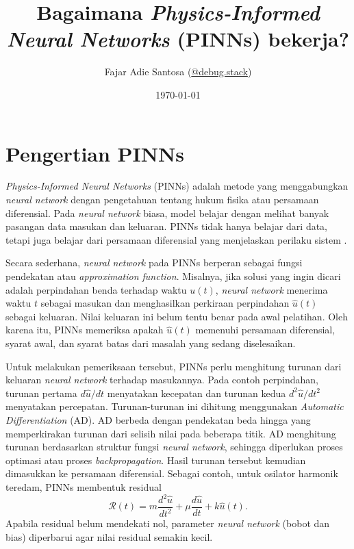 \documentclass[12pt, letterpaper]{article}
\title{Bagaimana \textit{Physics-Informed Neural Networks} (PINNs) bekerja?}
\author{Fajar Adie Santosa (\href{https://www.instagram.com/debug_stack/}{@debug.stack})}
\date{\today}
\begin{document}
\maketitle

\newpage
\tableofcontents
\newpage

\section{Pengertian PINNs}

\textit{Physics-Informed Neural Networks} (PINNs) adalah metode yang
menggabungkan \textit{neural network} dengan pengetahuan tentang hukum fisika atau persamaan diferensial. Pada
\textit{neural network} biasa, model belajar dengan melihat banyak pasangan data
masukan dan keluaran. PINNs tidak hanya belajar dari data, tetapi juga belajar
dari persamaan diferensial yang menjelaskan perilaku sistem \cite{matlab}.

Secara sederhana, \textit{neural network} pada PINNs berperan sebagai fungsi pendekatan atau \textit{approximation function}.
Misalnya, jika solusi yang ingin dicari adalah perpindahan benda terhadap waktu
$u(t)$, \textit{neural network} menerima waktu $t$ sebagai masukan dan menghasilkan perkiraan
perpindahan $\hat{u}(t)$ sebagai keluaran. Nilai keluaran ini belum tentu benar
pada awal pelatihan. Oleh karena itu, PINNs memeriksa apakah $\hat{u}(t)$
memenuhi persamaan diferensial, syarat awal, dan syarat batas dari masalah yang
sedang diselesaikan.

Untuk melakukan pemeriksaan tersebut, PINNs perlu menghitung turunan dari
keluaran \textit{neural network} terhadap masukannya. Pada contoh perpindahan, turunan pertama
$d\hat{u}/dt$ menyatakan kecepatan dan turunan kedua
$d^2\hat{u}/dt^2$ menyatakan percepatan. Turunan-turunan ini dihitung
menggunakan \textit{Automatic Differentiation} (AD).
AD berbeda dengan pendekatan beda hingga yang memperkirakan turunan dari
selisih nilai pada beberapa titik. AD menghitung turunan berdasarkan struktur
fungsi \textit{neural network}, sehingga diperlukan proses optimasi atau proses \textit{backpropagation}. Hasil turunan tersebut
kemudian dimasukkan ke persamaan diferensial. Sebagai contoh, untuk osilator
harmonik teredam, PINNs membentuk residual
\begin{equation}
    \mathcal{R}(t)
    =m\frac{d^2\hat{u}}{dt^2}
    +\mu\frac{d\hat{u}}{dt}
    +k\hat{u}(t).
\end{equation}
Apabila residual belum mendekati nol, parameter \textit{neural network} (bobot dan bias) diperbarui agar nilai residual semakin kecil.
\end{document}
